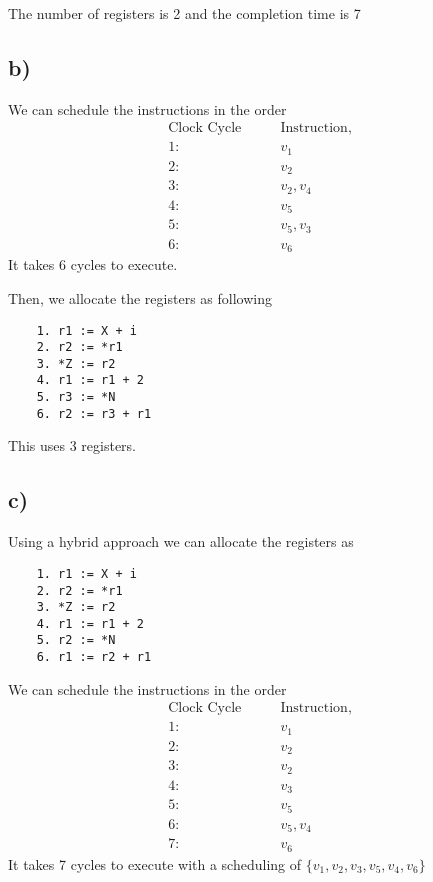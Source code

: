 \documentclass{article}
\begin{document}
The number of registers is 2 and the completion time is 7

\subsection*{b)}
We can schedule the instructions in the order
\begin{align*}
    \text{Clock Cycle}\qquad & \text{Instruction}, \\
    1:\qquad                 & v_1                 \\
    2: \qquad                & v_2                 \\
    3: \qquad                & v_2, v_4            \\
    4:  \qquad               & v_5                 \\
    5:  \qquad               & v_5, v_3            \\
    6:   \qquad              & v_6
\end{align*}
It takes 6 cycles to execute.

Then, we allocate the registers as following
\begin{verbatim}
    1. r1 := X + i
    2. r2 := *r1
    3. *Z := r2
    4. r1 := r1 + 2
    5. r3 := *N
    6. r2 := r3 + r1
\end{verbatim}
This uses 3 registers.

\subsection*{c)}
Using a hybrid approach we can allocate the registers as

\begin{verbatim}
    1. r1 := X + i
    2. r2 := *r1
    3. *Z := r2
    4. r1 := r1 + 2
    5. r2 := *N
    6. r1 := r2 + r1
\end{verbatim}

We can schedule the instructions in the order
\begin{align*}
    \text{Clock Cycle}\qquad & \text{Instruction}, \\
    1:\qquad                 & v_1                 \\
    2: \qquad                & v_2                 \\
    3: \qquad                & v_2                 \\
    4:  \qquad               & v_3                 \\
    5:  \qquad               & v_5                 \\
    6:  \qquad               & v_5, v_4            \\
    7:   \qquad              & v_6
\end{align*}
It takes 7 cycles to execute with a scheduling of $\{v_1, v_2, v_3, v_5, v_4, v_6\}$
\end{document}
